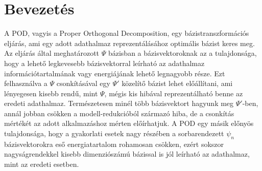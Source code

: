 
\newcommand\adj[1]{#1^{\mathrm{H}}}

\author{Szilágyi Gábor \\\vspace{2cm}\\ Konzulens: Dr. Bilicz Sándor}
\date{Budapest, \today}



    \maketitle
    \setcounter{page}{2}
    \section{Bevezetés}
            A POD, vagyis a Proper Orthogonal Decomposition, egy bázistranszformációs eljárás, ami egy adott adathalmaz reprezentálásához optimális bázist keres meg. Az eljárás által meghatározott $\Psi$ bázisban a bázisvektoroknak az a tulajdonsága, hogy a lehető legkevesebb bázisvektorral leírható az adathalmaz információtartalmának vagy energiájának lehető legnagyobb része. Ezt felhasználva a $\Psi$ csonkításával egy $\Psi'$ közelítő bázist lehet előállítani, ami lényegesen kisebb rendű, mint $\Psi$, mégis kis hibával reprezentálható benne az eredeti adathalmaz. Természetesen minél több bázisvektort hagyunk meg $\Psi'$-ben, annál jobban csökken a modell-redukcióból származó hiba, de a csonkítás mértékét az adott alkalmazáshoz mérten előírhatjuk. A POD egy másik előnyös tulajdonsága, hogy a gyakorlati esetek nagy részében a sorbarendezett $\psi_n$ bázisvektorokra eső energiatartalom rohamosan csökken, ezért sokszor nagyságrendekkel kisebb dimenziószámú bázissal is jól leírható az adathalmaz, mint az eredeti esetben.
